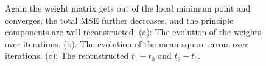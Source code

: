 \begin{figure}
\centering
{}
\caption{Again the weight matrix gets out of the local minimum point and converges,
the total MSE further decreases, and the principle components are well reconstructed.
(a): The evolution of the weights over iterations.
(b): The evolution of the mean square errors over iterations.
(c): The reconstructed $t_1-t_0$ and $t_2-t_0$.}
\label{global_best}
\end{figure}

